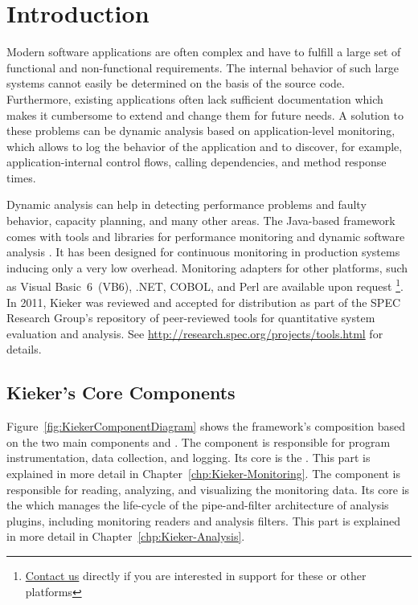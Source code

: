 \chapter{Introduction}\label{chp:Introduction}

	Modern software applications are often complex and have to fulfill a large set of functional and non-functional requirements. The internal behavior of such large systems cannot easily be determined on the basis of the source code. Furthermore, existing applications often lack sufficient documentation which makes it cumbersome to extend and change them for future needs. A solution to these problems can be dynamic analysis based on application-level monitoring, which allows to log the behavior of the application and to discover, for example, application-internal control flows, calling dependencies, and method response times.

	Dynamic analysis can help in detecting performance problems and faulty behavior, capacity planning, and many other areas. The Java-based \Kieker{} framework comes with tools and libraries for performance monitoring and dynamic software analysis \cite{KiekerICPE2012}. It has been designed for continuous monitoring in production systems inducing only a very low overhead. Monitoring adapters for other platforms, such as Visual Basic~6~(VB6), .NET, COBOL, and Perl are available upon request \footnote{\href{http://kieker-monitoring.net/support/}{Contact us} directly if you are interested in \Kieker{} support for these or other platforms}.  \\
	
	\noindent
	In 2011, Kieker was reviewed and accepted for distribution as part of the SPEC Research Group's repository of peer-reviewed tools for quantitative system evaluation and analysis. See \url{http://research.spec.org/projects/tools.html} for details.\\

	
	\section{Kieker's Core Components}		
		Figure~\ref{fig:KiekerComponentDiagram} shows the framework's composition based on the two main components \KiekerMonitoringPart{} and \KiekerAnalysisPart{}. The \KiekerMonitoringPart{} component is responsible for program instrumentation, data collection, and logging. Its core is the . This part is explained in more detail in Chapter~\ref{chp:Kieker-Monitoring}. The component \KiekerAnalysisPart{} is responsible for reading, analyzing, and visualizing the monitoring data. Its core is the  which manages the life-cycle of the pipe-and-filter architecture of analysis plugins, including monitoring readers and  analysis filters. This part is explained in more detail in Chapter~\ref{chp:Kieker-Analysis}.
		
